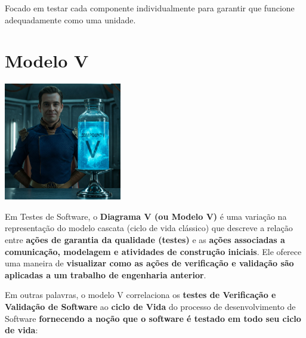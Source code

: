 \documentclass[
]{book}
\begin{document}
Focado em testar cada componente individualmente para garantir que funcione adequadamente como uma unidade.

\section{Modelo V}\label{modelo-v}

\includegraphics[width=2.02083in,height=\textheight]{images/VerificacaoValidacao/TestesSoftware/modelo_v.jpeg}

Em Testes de Software, o \textbf{Diagrama V (ou Modelo V)} é uma variação na representação do modelo cascata (ciclo de vida clássico) que descreve a relação entre \textbf{ações de garantia da qualidade (testes)} e as \textbf{ações associadas a comunicação, modelagem e atividades de construção iniciais}. Ele oferece uma maneira de \textbf{visualizar como as ações de verificação e validação são aplicadas a um trabalho de engenharia anterior}.

Em outras palavras, o modelo V correlaciona os \textbf{testes de Verificação e Validação de Software} ao \textbf{ciclo de Vida} do processo de desenvolvimento de Software \textbf{fornecendo a noção que o software é testado em todo seu ciclo de vida}:
\end{document}
